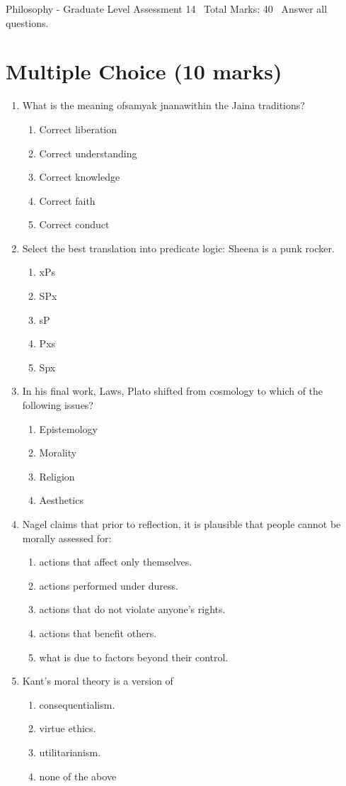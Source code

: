 \documentclass[12pt]{article}
\begin{document}
\begin{center}
Philosophy - Graduate Level Assessment 14 \
Total Marks: 40 \
Answer all questions.
\end{center}

\section*{Multiple Choice (10 marks)}
\begin{enumerate}[label=\arabic*.]
\item What is the meaning ofsamyak jnanawithin the Jaina traditions?
\begin{enumerate}[label=(\alph*)]
    \item Correct liberation
    \item Correct understanding
    \item Correct knowledge
    \item Correct faith
    \item Correct conduct
\end{enumerate}
\item Select the best translation into predicate logic: Sheena is a punk rocker.
\begin{enumerate}[label=(\alph*)]
    \item xPs
    \item SPx
    \item sP
    \item Pxs
    \item Spx
\end{enumerate}
\item In his final work, Laws, Plato shifted from cosmology to which of the following issues?
\begin{enumerate}[label=(\alph*)]
    \item Epistemology
    \item Morality
    \item Religion
    \item Aesthetics
\end{enumerate}
\item Nagel claims that prior to reflection, it is plausible that people cannot be morally assessed for:
\begin{enumerate}[label=(\alph*)]
    \item actions that affect only themselves.
    \item actions performed under duress.
    \item actions that do not violate anyone's rights.
    \item actions that benefit others.
    \item what is due to factors beyond their control.
\end{enumerate}
\item Kant's moral theory is a version of
\begin{enumerate}[label=(\alph*)]
    \item consequentialism.
    \item virtue ethics.
    \item utilitarianism.
    \item none of the above
\end{enumerate}
\end{enumerate}
\end{document}
